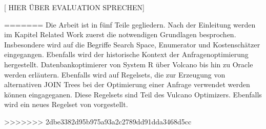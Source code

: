 [ HIER ÜBER EVALUATION SPRECHEN]



 
=======
Die Arbeit ist in fünf Teile gegliedern. Nach der Einleitung werden im Kapitel Related Work zuerst die notwendigen Grundlagen besprochen. Insbesondere wird auf die Begriffe Search Space, Enumerator und Kostenschätzer eingegangen. Ebenfalls wird der historische Kontext der Anfragenoptimierung hergestellt. Datenbankoptimierer von System R über Volcano bis hin zu Oracle werden erläutern. Ebenfalls wird auf Regelsets, die zur Erzeugung von alternativen JOIN Trees bei der Optimierung einer Anfrage verwendet werden können eingageganen. Diese Regelsets sind Teil des Vulcano Optimizers. Ebenfalls wird ein neues Regelset von \cite{shanbhag2014optimizing} vorgestellt.

>>>>>>> 2dbe3382d95b975a93a2c2789dd91dda3468d5cc
